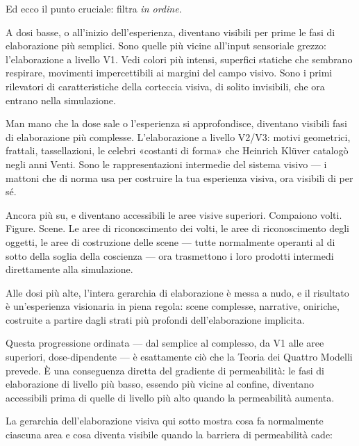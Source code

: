 \documentclass[11pt, twoside, openright]{book}
\begin{document}
Ed ecco il punto cruciale: filtra \textit{in ordine}.

A dosi basse, o all'inizio dell'esperienza, diventano visibili per prime le fasi di elaborazione più semplici. Sono quelle più vicine all'input sensoriale grezzo: l'elaborazione a livello V1. Vedi colori più intensi, superfici statiche che sembrano respirare, movimenti impercettibili ai margini del campo visivo. Sono i primi rilevatori di caratteristiche della corteccia visiva, di solito invisibili, che ora entrano nella simulazione.

Man mano che la dose sale o l'esperienza si approfondisce, diventano visibili fasi di elaborazione più complesse. L'elaborazione a livello V2/\allowbreak{}V3: motivi geometrici, frattali, tassellazioni, le celebri «costanti di forma» che Heinrich Klüver catalogò negli anni Venti. Sono le rappresentazioni intermedie del sistema visivo --- i mattoni che di norma usa per costruire la tua esperienza visiva, ora visibili di per sé.

Ancora più su, e diventano accessibili le aree visive superiori. Compaiono volti. Figure. Scene. Le aree di riconoscimento dei volti, le aree di riconoscimento degli oggetti, le aree di costruzione delle scene --- tutte normalmente operanti al di sotto della soglia della coscienza --- ora trasmettono i loro prodotti intermedi direttamente alla simulazione.

Alle dosi più alte, l'intera gerarchia di elaborazione è messa a nudo, e il risultato è un'esperienza visionaria in piena regola: scene complesse, narrative, oniriche, costruite a partire dagli strati più profondi dell'elaborazione implicita.

Questa progressione ordinata --- dal semplice al complesso, da V1 alle aree superiori, dose-dipendente --- è esattamente ciò che la Teoria dei Quattro Modelli prevede. È una conseguenza diretta del gradiente di permeabilità: le fasi di elaborazione di livello più basso, essendo più vicine al confine, diventano accessibili prima di quelle di livello più alto quando la permeabilità aumenta.

La gerarchia dell'elaborazione visiva qui sotto mostra cosa fa normalmente ciascuna area e cosa diventa visibile quando la barriera di permeabilità cade:
\end{document}
